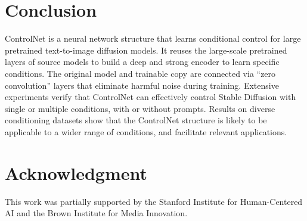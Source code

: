 \documentclass[10pt,twocolumn,letterpaper]{article}
\begin{document}
	\section{Conclusion}
	\label{sec:conclusion}
	
	ControlNet is a neural network structure that learns
	conditional control for large pretrained text-to-image
	diffusion models. It reuses the large-scale pretrained layers
	of source models to build a deep and strong encoder to learn
	specific conditions. The original model and trainable copy are
	connected via ``zero convolution'' layers that eliminate
	harmful noise during training.  Extensive experiments verify
	that ControlNet can effectively control Stable Diffusion with
	single or multiple conditions, with or without prompts.
	Results on diverse conditioning datasets show that the
	ControlNet structure is likely to be applicable to a wider
	range of conditions, and facilitate relevant applications.

\section*{Acknowledgment}

This work was partially supported by the Stanford Institute for Human-Centered AI and the Brown Institute for Media Innovation. 

	{\small
		
		
	}
	
\end{document}
